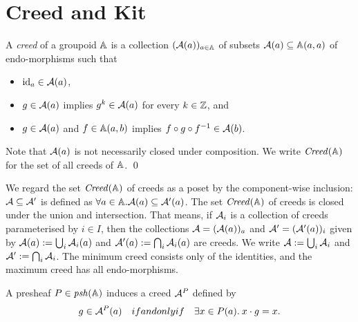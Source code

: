 \section{Creed and Kit}

\begin{definition}[Creed]
    A \emph{creed} of a groupoid \( \mathbb{A} \) is a collection \( (\mathcal{A}(a))_{a \in \mathbb{A}} \) of subsets \( \mathcal{A}(a) \subseteq \mathbb{A}(a,a) \) of endo-morphisms such that
    \begin{itemize}
        \item \( \mathrm{id}_a \in \mathcal{A}(a) \),
        \item \( g \in \mathcal{A}(a) \) implies \( g^k \in \mathcal{A}(a) \) for every \( k \in \mathbb{Z} \), and
        \item \( g \in \mathcal{A}(a) \) and \( f \in \mathbb{A}(a,b) \) implies \( f \circ g \circ f^{-1} \in \mathcal{A}(b) \).
    \end{itemize}
    Note that \( \mathcal{A}(a) \) is not necessarily closed under composition.
    We write \( \mathit{Creed}(\mathbb{A}) \) for the set of all creeds of \( \mathbb{A} \).
    \qed
\end{definition}

We regard the set \( \mathit{Creed}(\mathbb{A}) \) of creeds as a poset by the component-wise inclusion: \( \mathcal{A} \subseteq \mathcal{A}' \) is defined as \( \forall a \in \mathbb{A}. \mathcal{A}(a) \subseteq \mathcal{A}'(a) \).
The set \( \mathit{Creed}(\mathbb{A}) \) of creeds is closed under the union and intersection.
That means, if \( \mathcal{A}_i \) is a collection of creeds parameterised by \( i \in I \), then the collections \( \mathcal{A} = (\mathcal{A}(a))_a \) and \( \mathcal{A}' = (\mathcal{A}'(a))_i \) given by \( \mathcal{A}(a) := \bigcup_i \mathcal{A}_i(a) \) and \( \mathcal{A}'(a) := \bigcap_i \mathcal{A}_i(a) \) are creeds.
We write \( \mathcal{A} := \bigcup_i \mathcal{A}_i \) and \( \mathcal{A}' := \bigcap_i \mathcal{A}_i \).
The minimum creed consists only of the identities, and the maximum creed has all endo-morphisms.

A presheaf \( P \in \mathit{psh}(\mathbb{A}) \) induces a creed \( \mathcal{A}^P \) defined by
\begin{equation*}
    g \in \mathcal{A}^P(a)
    \quad\relax{if and only if}\quad
    \exists x \in P(a).\: x \cdot g = x.
\end{equation*}

